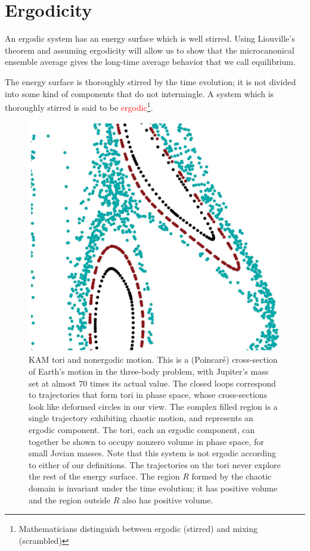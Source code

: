 \documentclass[12pt,a4paper]{article}
\newcounter{theo}[section]\setcounter{theo}{0}
\begin{document}
\section{Ergodicity}
\cite{sethna2006statistical} An ergodic system has an energy surface which is well stirred. Using Liouville's theorem and assuming ergodicity will allow us to show that the microcanonical ensemble average gives the long-time average behavior that we call equilibrium. 

The energy surface is thoroughly stirred by the time evolution; it is not divided into some kind of components that do not intermingle. A system which is thoroughly stirred is said to be \textcolor{red}{ergodic}\footnote{Mathematicians distinguish between ergodic (stirred) and mixing (scrambled)}.

\begin{figure}
\centering
\includegraphics[height=10.cm, angle=0]{nonergodic.eps}
\caption{
KAM tori and nonergodic motion. This is a (Poincar\'e) cross-section of Earth's motion in the three-body problem, with Jupiter's mass set at almost $70$ times its actual value. The closed loops correspond to trajectories that form tori in phase space, whose cross-sections look like deformed circles in our view. The complex filled region is a single trajectory exhibiting chaotic motion, and represents an ergodic component. The tori, each an ergodic component, can together be shown to occupy nonzero volume in phase space, for small Jovian masses. Note that this system is not ergodic according to either of our definitions. The trajectories on the tori never explore the rest of the energy surface. The region $R$ formed by the chaotic domain is invariant under the time evolution; it has positive volume and the region outside $R$ also has positive volume.
}
\label{fig:nonergodic}
\end{figure}
\end{document}
